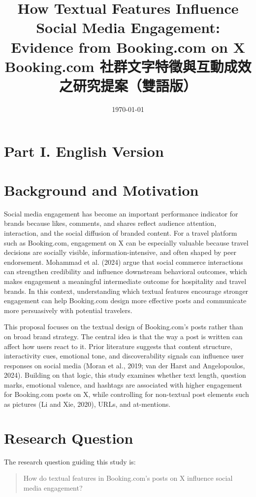 \documentclass[12pt,a4paper]{ctexart}
\title{How Textual Features Influence Social Media Engagement:\\Evidence from Booking.com on X\\[0.5em]
\large Booking.com 社群文字特徵與互動成效之研究提案（雙語版）}
\author{}
\date{\today}
\begin{document}
\maketitle
\tableofcontents
\newpage

\section*{Part I. English Version}

\section{Background and Motivation}
Social media engagement has become an important performance indicator for brands because likes, comments, and shares reflect audience attention, interaction, and the social diffusion of branded content. For a travel platform such as Booking.com, engagement on X can be especially valuable because travel decisions are socially visible, information-intensive, and often shaped by peer endorsement. Mohammad et al. (2024) argue that social commerce interactions can strengthen credibility and influence downstream behavioral outcomes, which makes engagement a meaningful intermediate outcome for hospitality and travel brands. In this context, understanding which textual features encourage stronger engagement can help Booking.com design more effective posts and communicate more persuasively with potential travelers.

This proposal focuses on the textual design of Booking.com's posts rather than on broad brand strategy. The central idea is that the way a post is written can affect how users react to it. Prior literature suggests that content structure, interactivity cues, emotional tone, and discoverability signals can influence user responses on social media (Moran et al., 2019; van der Harst and Angelopoulos, 2024). Building on that logic, this study examines whether text length, question marks, emotional valence, and hashtags are associated with higher engagement for Booking.com posts on X, while controlling for non-textual post elements such as pictures (Li and Xie, 2020), URLs, and at-mentions.

\section{Research Question}
The research question guiding this study is:

\begin{quote}
How do textual features in Booking.com's posts on X influence social media engagement?
\end{quote}
\end{document}
